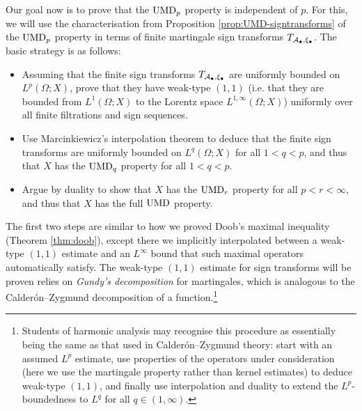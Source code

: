 Our goal now is to prove that the $\mathrm{UMD}_{p}$ property is independent of $p$.
For this, we will use the characterisation from Proposition \ref{prop:UMD-signtransforms} of the $\mathrm{UMD}_{p}$ property in terms of finite martingale sign transforms $T_{\mathcal{A}_{\bullet}, \xi_{\bullet}}$.
The basic strategy is as follows:
\begin{itemize}
\item Assuming that the finite sign transforms $T_{\mathcal{A}_{\bullet},\xi_{\bullet}}$ are uniformly bounded on $L^p(\Omega;X)$, prove that they have weak-type $(1,1)$ (i.e. that they are bounded from $L^1(\Omega;X)$ to the Lorentz space $L^{1,\infty}(\Omega;X)$) uniformly over all finite filtrations and sign sequences.
\item Use Marcinkiewicz's interpolation theorem to deduce that the finite sign transforms are uniformly bounded on $L^q(\Omega;X)$ for all $1 < q < p$, and thus that $X$ has the $\mathrm{UMD}_{q}$ property for all $1 < q < p$.
\item Argue by duality to show that $X$ has the $\mathrm{UMD}_{r}$ property for all $p < r < \infty$, and thus that $X$ has the full $\mathrm{UMD}$ property.
\end{itemize}

The first two steps are similar to how we proved Doob's maximal inequality (Theorem \ref{thm:doob}), except there we implicitly interpolated between a weak-type $(1,1)$ estimate and an $L^\infty$ bound that such maximal operators automatically satisfy.
The weak-type $(1,1)$ estimate for sign transforms will be proven relies on \emph{Gundy's decomposition} for martingales, which is analogous to the Calder\'on--Zygmund decomposition of a function.\footnote{
Students of harmonic analysis may recognise this procedure as essentially being the same as that used in Calder\'on--Zygmund theory: start with an assumed $L^p$ estimate, use properties of the operators under consideration (here we use the martingale property rather than kernel estimates) to deduce weak-type $(1,1)$, and finally use interpolation and duality to extend the $L^p$-boundedness to $L^q$ for all $q \in (1,\infty)$.}


